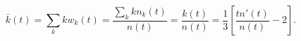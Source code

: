 \begin{equation}\label{eq10}
\bar{k}(t)=\sum_k k w_k(t)=\frac{\sum_k k n_k(t)}{n(t)}=
\frac{k(t)}{n(t)}=\frac{1}{3}\left[\frac{t n'(t)}{n(t)}-2\right].
\end{equation}

